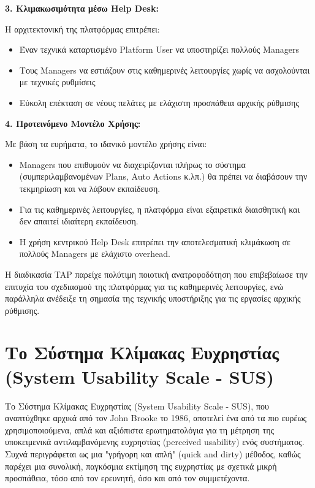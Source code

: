 \documentclass[
	12pt, %
	oneside, %
	greek,
	onehalfspacing, %
	liststotoc, %
	toctotoc, %
	parskip, %
	headsepline, %
]{MastersDoctoralThesis} %
\begin{document}
\textbf{3. Κλιμακωσιμότητα μέσω Help Desk:}

Η αρχιτεκτονική της πλατφόρμας επιτρέπει:
\begin{itemize}
    \item Έναν τεχνικά καταρτισμένο Platform User να υποστηρίζει πολλούς Managers
    \item Τους Managers να εστιάζουν στις καθημερινές λειτουργίες χωρίς να ασχολούνται με τεχνικές ρυθμίσεις
    \item Εύκολη επέκταση σε νέους πελάτες με ελάχιστη προσπάθεια αρχικής ρύθμισης
\end{itemize}

\textbf{4. Προτεινόμενο Μοντέλο Χρήσης:}

Με βάση τα ευρήματα, το ιδανικό μοντέλο χρήσης είναι:
\begin{itemize}
    \item Managers που επιθυμούν να διαχειρίζονται πλήρως το σύστημα (συμπεριλαμβανομένων Plans, Auto Actions κ.λπ.) θα πρέπει να διαβάσουν την τεκμηρίωση και να λάβουν εκπαίδευση.
    \item Για τις καθημερινές λειτουργίες, η πλατφόρμα είναι εξαιρετικά διαισθητική και δεν απαιτεί ιδιαίτερη εκπαίδευση.
    \item Η χρήση κεντρικού Help Desk επιτρέπει την αποτελεσματική κλιμάκωση σε πολλούς Managers με ελάχιστο overhead.
\end{itemize}

Η διαδικασία TAP παρείχε πολύτιμη ποιοτική ανατροφοδότηση που επιβεβαίωσε την επιτυχία του σχεδιασμού της πλατφόρμας για τις καθημερινές λειτουργίες, ενώ παράλληλα ανέδειξε τη σημασία της τεχνικής υποστήριξης για τις εργασίες αρχικής ρύθμισης.

\section{Το Σύστημα Κλίμακας Ευχρηστίας (System Usability Scale - SUS)}
\label{sec:sus}

Το Σύστημα Κλίμακας Ευχρηστίας (System Usability Scale - SUS), που αναπτύχθηκε αρχικά από τον John Brooke το 1986, αποτελεί ένα από τα πιο ευρέως χρησιμοποιούμενα, απλά και αξιόπιστα ερωτηματολόγια για τη μέτρηση της υποκειμενικά αντιλαμβανόμενης ευχρηστίας (perceived usability) ενός συστήματος. Συχνά περιγράφεται ως μια "γρήγορη και απλή" (quick and dirty) μέθοδος, καθώς παρέχει μια συνολική, παγκόσμια εκτίμηση της ευχρηστίας με σχετικά μικρή προσπάθεια, τόσο από τον ερευνητή, όσο και από τον συμμετέχοντα.
\end{document}
